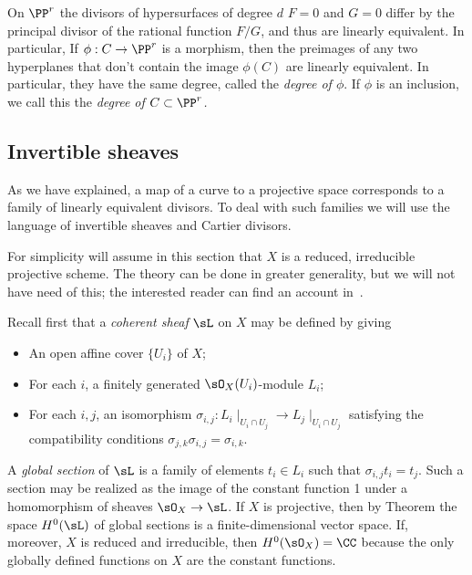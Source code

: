 On $\PP^r$ the divisors of hypersurfaces of degree $d$ $F = 0$ and $G=0$ differ by the principal divisor of the rational function $F/G$,
and thus are linearly equivalent. In particular, If $\phi : C \to \PP^r$ is a morphism, then the preimages
of any two hyperplanes that don't contain the image $\phi(C)$ are linearly equivalent. In particular, they have the same
degree, called the \emph{degree of $\phi$}. If $\phi$ is an inclusion, we call this the \emph{degree of $C\subset \PP^r$.}

\subsection{Invertible sheaves}\label{Invertible sheaves}

As we have explained, a map of a curve to a projective space corresponds to a family of linearly equivalent divisors.
To deal with such families we will use the language of invertible sheaves and Cartier divisors. 

For simplicity will assume in this section that $X$ is a reduced, irreducible projective
scheme. The theory can be done in greater generality, but we will not have need of this; the interested reader can find an account in~\cite{Hartshorne1977}.

Recall first that a \emph{coherent sheaf} $\sL$ on $X$ may be defined by
giving 
\begin{itemize}
 \item An open affine cover $\{U_{i}\}$ of $X$; 
 \item For each $i$, a finitely generated $\sO_{X}(U_{i})$-module $L_{i}$;
 \item For each $i,j$, an isomorphism $\sigma_{i,j}: L_{i}\mid_{U_{i}\cap U_{j}} \to L_{j}\mid_{U_{i}\cap U_{j}}$
 satisfying the compatibility conditions $\sigma_{j,k}\sigma_{i,j} = \sigma_{i,k}$. 
 \end{itemize}

A \emph{global section} of $\sL$ is a family of elements $t_{i}\in L_{i}$ such that 
$\sigma_{i,j} t_{i} = t_{j}$. Such a section may be realized as the image of the constant function 1 under
a homomorphism of sheaves $\sO_{X} \to \sL$. If $X$ is projective, then 
by Theorem \cite[Thm III.5.2]{H} the space $H^{0}(\sL)$  of global sections is
a finite-dimensional vector space. If, moreover, $X$ is reduced and irreducible, then $H^{0}(\sO_{X}) = \CC$ because the only globally defined
functions on $X$ are the constant functions.

